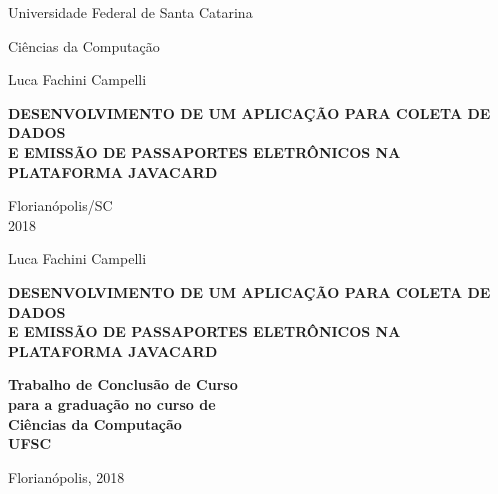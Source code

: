 \documentclass[12pt]{article}
\begin{document}
	\begin{center}

		{\LARGE Universidade Federal de Santa Catarina \par}
		\vspace {2cm}
		
		Ciências da Computação
		\vspace{2cm}

		Luca Fachini Campelli
		\vspace {4cm}

		\textbf{DESENVOLVIMENTO DE UM APLICAÇÃO PARA COLETA DE DADOS \\
				E EMISSÃO DE PASSAPORTES ELETRÔNICOS NA PLATAFORMA JAVACARD}
		\vspace {10cm}
		
		Florianópolis/SC \\

		2018
	\end{center}

	\newpage
	\begin{center}
		Luca Fachini Campelli
		\vspace{2cm}
		
		\textbf{\large DESENVOLVIMENTO DE UM APLICAÇÃO PARA COLETA DE DADOS \\
				E EMISSÃO DE PASSAPORTES ELETRÔNICOS NA PLATAFORMA JAVACARD}
		\vspace{2cm}

		\hfill \textbf{Trabalho de Conclusão de Curso \\}
		\hfill \textbf{para a graduação no curso de\\}
		\hfill \textbf{Ciências \hspace{18pt} da \hspace{18pt} Computação \\}
		\hfill \textbf{UFSC  \hspace{60pt}}

		\vspace{1cm}

		\hfill Florianópolis, 2018

	\end{center}

	\newpage
\end{document}
